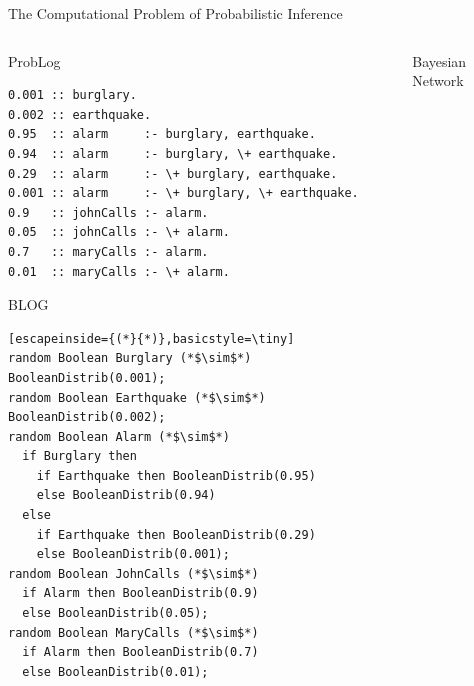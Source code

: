 \documentclass{beamer}
\begin{document}
\begin{frame}[fragile]{The Computational Problem of Probabilistic Inference}
  \vspace{-0.75cm}
  \begin{columns}[t]
    \begin{column}{0.65\textwidth}
      \centering
      \begin{block}{ProbLog}
        \vspace{-0.2cm}
        \begin{lstlisting}[basicstyle=\tiny]
0.001 :: burglary.
0.002 :: earthquake.
0.95  :: alarm     :- burglary, earthquake.
0.94  :: alarm     :- burglary, \+ earthquake.
0.29  :: alarm     :- \+ burglary, earthquake.
0.001 :: alarm     :- \+ burglary, \+ earthquake.
0.9   :: johnCalls :- alarm.
0.05  :: johnCalls :- \+ alarm.
0.7   :: maryCalls :- alarm.
0.01  :: maryCalls :- \+ alarm.
        \end{lstlisting}
        \vspace{-0.2cm}
      \end{block}
      \begin{block}{BLOG}
        \vspace{-0.2cm}
        \begin{lstlisting}[escapeinside={(*}{*)},basicstyle=\tiny]
random Boolean Burglary (*$\sim$*) BooleanDistrib(0.001);
random Boolean Earthquake (*$\sim$*) BooleanDistrib(0.002);
random Boolean Alarm (*$\sim$*)
  if Burglary then
    if Earthquake then BooleanDistrib(0.95)
    else BooleanDistrib(0.94)
  else
    if Earthquake then BooleanDistrib(0.29)
    else BooleanDistrib(0.001);
random Boolean JohnCalls (*$\sim$*)
  if Alarm then BooleanDistrib(0.9)
  else BooleanDistrib(0.05);
random Boolean MaryCalls (*$\sim$*)
  if Alarm then BooleanDistrib(0.7)
  else BooleanDistrib(0.01);
        \end{lstlisting}
        \vspace{-0.2cm}
      \end{block}
    \end{column}
    \begin{column}{0.35\textwidth}
      \begin{block}{Bayesian Network}
        \centering
\end{block}
\end{column}
\end{columns}
\end{frame}
\end{document}
